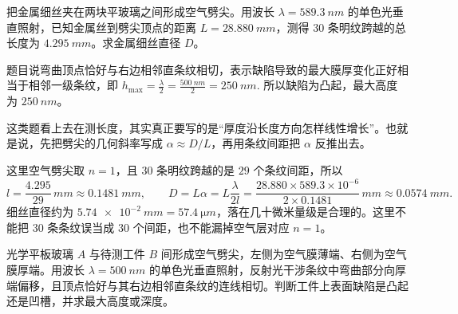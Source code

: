 \begin{exercise}[用劈尖条纹间距测金属细丝直径时为什么先写几何斜率]
把金属细丝夹在两块平玻璃之间形成空气劈尖。用波长 \(\lambda=\SI{589.3}{nm}\) 的单色光垂直照射，已知金属丝到劈尖顶点的距离 \(L=\SI{28.880}{mm}\)，测得 \(30\) 条明纹跨越的总长度为 \(\SI{4.295}{mm}\)。求金属细丝直径 \(D\)。
\end{exercise}

\begin{solution}
题目说弯曲顶点恰好与右边相邻直条纹相切，表示缺陷导致的最大膜厚变化正好相当于相邻一级条纹，即
 \(h_{\max}=\frac{\lambda}{2} =\frac{\SI{500}{nm}}{2} =\SI{250}{nm}.\) 
所以缺陷为凸起，最大高度为 \(\SI{250}{nm}\)。
\end{solution}
\begin{solution}
这类题看上去在测长度，其实真正要写的是“厚度沿长度方向怎样线性增长”。也就是说，先把劈尖的几何斜率写成 \(\alpha\approx D/L\)，再用条纹间距把 \(\alpha\) 反推出去。

这里空气劈尖取 \(n=1\)，且 \(30\) 条明纹跨越的是 \(29\) 个条纹间距，所以
\[
l=\frac{4.295}{29}\,\si{mm}\approx \SI{0.1481}{mm},\qquad
D=L\alpha=L\frac{\lambda}{2l}
=\frac{28.880\times 589.3\times10^{-6}}{2\times0.1481}\,\si{mm}
\approx \SI{0.0574}{mm}.
\]
细丝直径约为 \(\SI{5.74e-2}{mm}=\SI{57.4}{\micro m}\)，落在几十微米量级是合理的。这里不能把 \(30\) 条条纹误当成 \(30\) 个间距，也不能漏掉空气层对应 \(n=1\)。
\end{solution}

\begin{exercise}[空气劈尖条纹弯向厚端时怎样判断凸凹缺陷]
光学平板玻璃 \(A\) 与待测工件 \(B\) 间形成空气劈尖，左侧为空气膜薄端、右侧为空气膜厚端。用波长 \(\lambda=\SI{500}{nm}\) 的单色光垂直照射，反射光干涉条纹中弯曲部分向厚端偏移，且顶点恰好与其右边相邻直条纹的连线相切。判断工件上表面缺陷是凸起还是凹槽，并求最大高度或深度。
\end{exercise}

